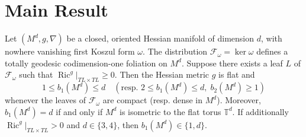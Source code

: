 \section{Main Result}


\begin{thm}\label{thm:main}
Let $(M^d, g, \nabla)$ be a closed, oriented Hessian manifold of dimension $d$, with
nowhere vanishing first Koszul form $\omega$. The distribution $\mathcal{F}_\omega = \ker\omega$ defines a totally geodesic 
codimension-one foliation on $M^d$. Suppose there exists a leaf $L$ of $\mathcal{F}_\omega$ such that
 $\operatorname{Ric}^g|_{TL\times TL} \ge 0$. Then the Hessian metric $g$ is flat and
\[
1 \le b_1(M^d) \le d \quad (\text{resp. } 2 \le b_1(M^d) \le d,\; b_2(M^d) \ge 1)
\]
whenever the leaves of $\mathcal{F}_\omega$ are compact (resp. dense in $M^d$). 
Moreover, $b_1(M^d) = d$ if and only if $M^d$ is isometric to the flat torus $\mathbb{T}^d$. If additionally $\operatorname{Ric}^g|_{TL\times TL} > 0$ and $d \in \{3,4\}$, then $b_1(M^d) \in \{1, d\}$.
\end{thm}




